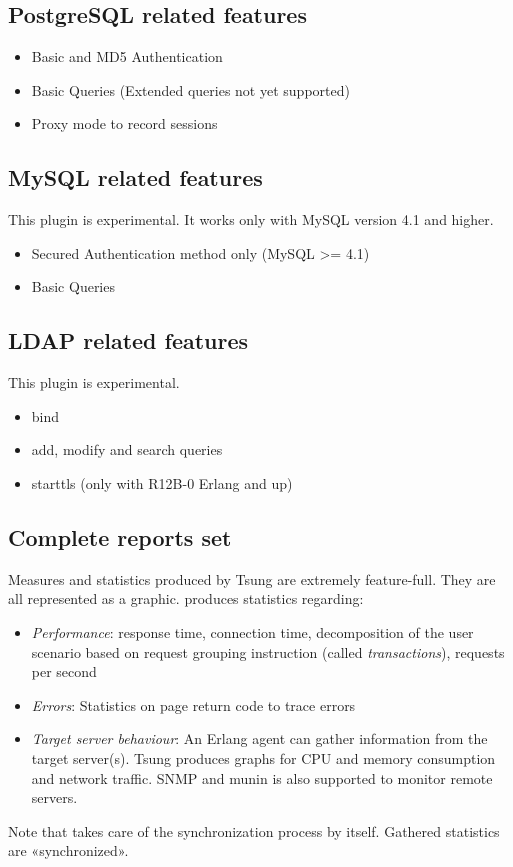 \documentclass{TSUNG-en}
\begin{document}
\subsection{PostgreSQL related features}

\begin{itemize}
\item Basic and MD5 Authentication
\item Basic Queries (Extended queries not yet supported)
\item Proxy mode to record sessions
\end{itemize}

\subsection{MySQL related features}
This plugin is experimental. It works only with MySQL version 4.1 and higher.
\begin{itemize}
\item Secured Authentication method only (MySQL >= 4.1)
\item Basic Queries
\end{itemize}

\subsection{LDAP related features}
This plugin is experimental.

\begin{itemize}
\item bind
\item add, modify and search queries
\item starttls (only with R12B-0 Erlang and up)
\end{itemize}

\subsection{Complete reports set}

Measures and statistics produced by Tsung are extremely feature-full.
They are all represented as a graphic.  produces
statistics regarding:

\begin{itemize}
\item \emph{Performance}: response time, connection time,  decomposition of the user scenario based on request grouping  instruction (called \textit{transactions}), requests per second
\item \emph{Errors}: Statistics on page return code to trace errors
\item \emph{Target server behaviour}: An Erlang agent can gather information
from the target server(s). Tsung produces graphs for CPU and memory
consumption and network traffic. SNMP and munin is also supported to
monitor remote servers.
\end{itemize}
\par Note that  takes care of the synchronization process
by itself. Gathered statistics are «synchronized».
\end{document}
